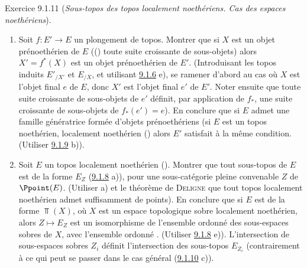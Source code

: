 \documentclass[10pt]{../fichiers-configuration-latex/smfart}
\begin{document}
\begin{enonce*}[remark]{Exercice 9.1.11}
(\emph{Sous-topos des topos localement noethériens. Cas des espaces
noethériens}).
\begin{enumerate}
\renewcommand{\theenumi}{\alph{enumi}}
\renewcommand{\labelenumi}{\theenumi)}
\item Soit $f:E'\rightarrow E$ un plongement de topos. Montrer que si
$X$ est un objet prénoethérien de $E$ (\ie () toute suite
croissante de sous-objets\pageoriginale {})
alors $X'=f^{\ast}(X)$ est un objet prénoethérien de $E'$.
(Introduisant les topos induits ${E'}_{/X'}$ et $E_{/X}$, et
utilisant \hyperref[IV.exer9.1.6]{9.1.6} e), se ramener d'abord au cas où $X$
est l'objet final $e$ de $E$, donc $X'$ est l'objet final $e'$ de
$E'$. Noter ensuite que toute suite croissante de sous-objets de
$e'$ définit, par application de $f_{\ast}$, une suite croissante de
sous-objets de $f_{\ast}(e')=e$). En conclure que si $E$ admet une
famille génératrice formée d'objets prénoethériens (\resp si $E$ est
un topos noethérien, \resp localement noethérien () alors $E'$
satisfait à la même condition. (Utiliser \hyperref[IV.exer9.1.9]{9.1.9} b)).

\item Soit $E$ un topos localement noethérien (). Montrer que
tout sous-topos de $E$ est de la forme $E_Z$ (\hyperref[IV.exer9.1.8]{9.1.8}
a)), pour une sous-catégorie pleine convenable $Z$ de $\Ppoint(E)$.
(Utiliser a) et le théorème de \textsc{Deligne} que tout topos
localement noethérien admet suffisamment de points). En conclure que
si $E$ est de la forme $\Top(X)$, où $X$ est un espace topologique
sobre localement noethérien, alors $Z\mapsto E_Z$ est un
isomorphisme de l'ensemble ordonné des sous-espaces sobres de $X$,
avec l'ensemble ordonné . (Utiliser
\hyperref[IV.exer9.1.8]{9.1.8} e)). L'intersection de sous-espaces sobres $Z_i$
 définit l'intersection des sous-topos
$E_{Z_i}$ (contrairement à ce qui peut se passer dans le cas général
(\hyperref[IV.exer9.1.10]{9.1.10} c)).


\end{enumerate}
\end{enonce*}
\end{document}
